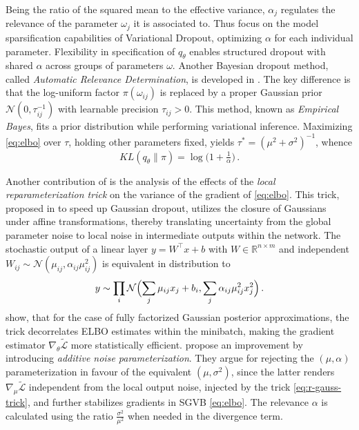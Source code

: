 \documentclass[a4paper,10pt]{article}
\begin{document}
Being the ratio of the squared mean to the effective variance, $\alpha_j$ regulates the
relevance of the parameter $\omega_j$ it is associated to. Thus \citet{molchanov_variational_2017}
focus on the model sparsification capabilities of Variational Dropout, optimizing $\alpha$
for each individual parameter. Flexibility in specification of $q_\theta$ enables structured
dropout with shared $\alpha$ across groups of parameters $\omega$. Another Bayesian dropout
method, called \textit{Automatic Relevance Determination}, is developed in \citep{kharitonov_variational_2018}.
The key difference is that the log-uniform factor $\pi(\omega_{ij})$ is replaced by a proper
Gaussian prior $
  \mathcal{N}(0, \tau^{-1}_{ij})
$ with learnable precision $\tau_{ij} > 0$. This method, known as \textit{Empirical Bayes},
fits a prior distribution while performing variational inference. Maximizing \eqref{eq:elbo}
over $\tau$, holding other parameters fixed, yields $
  \tau^* = {(\mu^2 + \sigma^2)}^{-1}
$, whence
\begin{equation}  \label{eq:ard-kl-div-real}
  KL(q_\theta \| \pi)
    = \log{\bigl(1 + \tfrac1{\alpha} \bigr)}
    \,.
\end{equation}

Another contribution of \citep{kingma_variational_2015} is the analysis of the effects of the
\textit{local reparameterization trick} on the variance of the gradient of \eqref{eq:elbo}.
This trick, proposed in \citep{wang_fast_2013} to speed up Gaussian dropout, utilizes the
closure of Gaussians under affine transformations, thereby translating uncertainty from the
global parameter noise to local noise in intermediate outputs within the network.
%
The stochastic output of a linear layer $
  y = W^\top x + b
$ with $
  W \in \mathbb{R}^{n\times m}
$ and independent $
  W_{ij} \sim \mathcal{N}(\mu_{ij}, \alpha_{ij} \mu_{ij}^2)
$ is equivalent in distribution to
\begin{equation}  \label{eq:r-gauss-trick}
    y \sim \prod_i \mathcal{N}\Bigl(
          \sum_j \mu_{ij} x_j + b_i,
          \sum_j \alpha_{ij} \mu_{ij}^2 x_j^2
      \Bigr)
    \,.
\end{equation}
%
\citet{kingma_variational_2015} show, that for the case of fully factorized Gaussian
posterior approximations, the trick decorrelates ELBO estimates within the minibatch,
making the gradient estimator $\nabla_\theta \tilde{\mathcal{L}}$ more statistically
efficient. \citet{molchanov_variational_2017} propose an improvement by introducing
\textit{additive noise parameterization}. They argue for rejecting the $(\mu, \alpha)$
parameterization in favour of the equivalent $(\mu, \sigma^2)$, since the latter renders $
  \nabla_\mu \tilde{\mathcal{L}}
$ independent from the local output noise, injected by the trick \eqref{eq:r-gauss-trick},
and further stabilizes gradients in SGVB \eqref{eq:elbo}. The relevance $\alpha$ is
calculated using the ratio $
  \tfrac{\sigma^2}{\mu^2}
$ when needed in the divergence term.
\end{document}
